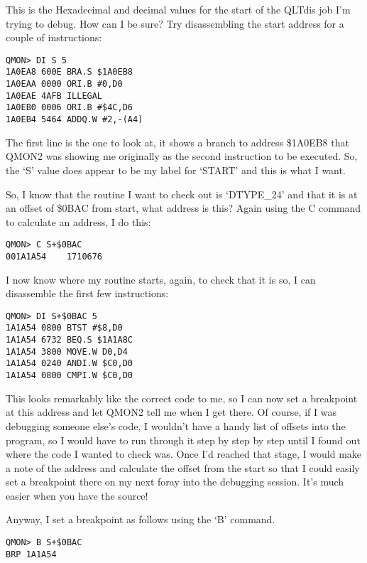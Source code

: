 \begin{appendix}
This is the Hexadecimal and decimal values for the start of the QLTdis job I'm
trying to debug. How can I be sure? Try disassembling the start address for a
couple of instructions:

\begin{lstlisting}[frame=none,numbers=none,]
QMON> DI S 5
1A0EA8 600E BRA.S $1A0EB8
1A0EAA 0000 ORI.B #0,D0
1A0EAE 4AFB ILLEGAL
1A0EB0 0006 ORI.B #$4C,D6
1A0EB4 5464 ADDQ.W #2,-(A4)
\end{lstlisting}

The first line is the one to look at, it shows a branch to address \$1A0EB8 that
QMON2 was showing me originally as the second instruction to be executed. So, the
`S' value does appear to be my label for `START' and this is what I want.

So, I know that the routine I want to check out is `DTYPE\_24' and that it is at
an offset of \$0BAC from start, what address is this? Again using the C command
to calculate an address, I do this:

\begin{lstlisting}[frame=none,numbers=none,]
QMON> C S+$0BAC
001A1A54    1710676
\end{lstlisting}

I now know where my routine starts, again, to check that it is so, I can
disassemble the first few instructions:

\begin{lstlisting}[frame=none,numbers=none,]
QMON> DI S+$0BAC 5
1A1A54 0800 BTST #$8,D0
1A1A54 6732 BEQ.S $1A1A8C
1A1A54 3800 MOVE.W D0,D4
1A1A54 0240 ANDI.W $C0,D0
1A1A54 0800 CMPI.W $C0,D0
\end{lstlisting}

This looks remarkably like the correct code to me, so I can now set a breakpoint
at this address and let QMON2 tell me when I get there. Of course, if I was
debugging someone else's code, I wouldn't have a handy list of offsets into the
program, so I would have to run through it step by step by step until I found
out where the code I wanted to check was. Once I'd reached that stage, I would
make a note of the address and calculate the offset from the start so that I
could easily set a breakpoint there on my next foray into the debugging
session. It's much easier when you have the source!

Anyway, I set a breakpoint as follows using the `B' command.

\begin{lstlisting}[frame=none,numbers=none,]
QMON> B S+$0BAC
BRP 1A1A54
\end{lstlisting}


\end{appendix}
